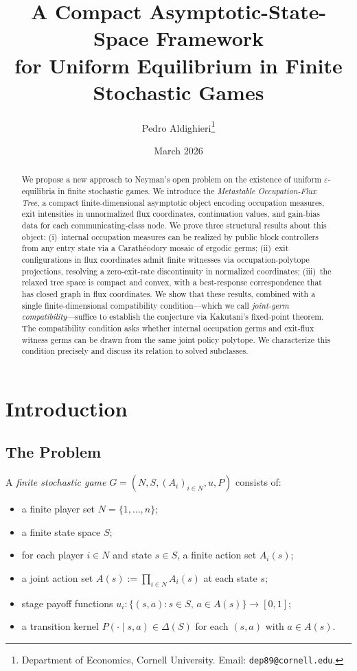 \documentclass[12pt,a4paper]{article}
\title{\textbf{A Compact Asymptotic-State-Space Framework\\for Uniform Equilibrium in Finite Stochastic Games}}
\author{Pedro Aldighieri\thanks{Department of Economics, Cornell University. Email: \texttt{dep89@cornell.edu}.}}
\date{March 2026}
\theoremstyle{definition}
\newcommand{\eps}{\varepsilon}
\begin{document}
\maketitle

\begin{abstract}
We propose a new approach to Neyman's open problem on the existence of uniform $\eps$-equilibria in finite stochastic games.
We introduce the \emph{Metastable Occupation-Flux Tree}, a compact finite-dimensional asymptotic object encoding occupation measures, exit intensities in unnormalized flux coordinates, continuation values, and gain-bias data for each communicating-class node.
We prove three structural results about this object:
(i)~internal occupation measures can be realized by public block controllers from any entry state via a Carath\'eodory mosaic of ergodic germs;
(ii)~exit configurations in flux coordinates admit finite witnesses via occupation-polytope projections, resolving a zero-exit-rate discontinuity in normalized coordinates;
(iii)~the relaxed tree space is compact and convex, with a best-response correspondence that has closed graph in flux coordinates.
We show that these results, combined with a single finite-dimensional compatibility condition---which we call \emph{joint-germ compatibility}---suffice to establish the conjecture via Kakutani's fixed-point theorem.
The compatibility condition asks whether internal occupation germs and exit-flux witness germs can be drawn from the same joint policy polytope.
We characterize this condition precisely and discuss its relation to solved subclasses.
\end{abstract}

\tableofcontents

\section{Introduction}
\label{sec:intro}

\subsection{The Problem}

A \emph{finite stochastic game} $G = (N, S, (A_i)_{i \in N}, u, P)$ consists of:
\begin{itemize}
\item a finite player set $N = \{1, \ldots, n\}$;
\item a finite state space $S$;
\item for each player $i \in N$ and state $s \in S$, a finite action set $A_i(s)$;
\item a joint action set $A(s) := \prod_{i \in N} A_i(s)$ at each state $s$;
\item stage payoff functions $u_i \colon \{(s, a) : s \in S, \, a \in A(s)\} \to [0,1]$;
\item a transition kernel $P(\cdot \mid s, a) \in \Delta(S)$ for each $(s, a)$ with $a \in A(s)$.
\end{itemize}
\end{document}
